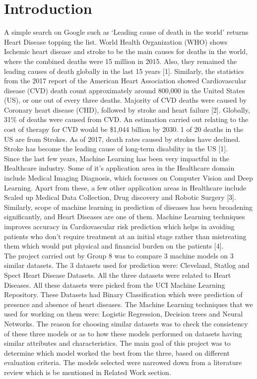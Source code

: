 \documentclass[conference]{IEEEtran}
\begin{document}
\section{Introduction}
A simple search on Google such as ‘Leading cause of death in the world’ returns Heart Disease topping the list. World Health Organization (WHO) shows Ischemic heart disease and stroke to be the main causes for deaths in the world, where the combined deaths were 15 million in 2015. Also, they remained the leading causes of death globally in the last 15 years [1]. Similarly, the statistics from the 2017 report of the American Heart Association showed Cardiovascular disease (CVD) death count approximately around 800,000 in the United States (US), or one out of every three deaths. Majority of CVD deaths were caused by Coronary heart disease (CHD), followed by stroke and heart failure [2]. Globally, 31\% of deaths were caused from CVD. An estimation carried out relating to the cost of therapy for CVD would be \$1,044 billion by 2030. 1 of 20 deaths in the US are from Strokes. As of 2017, death rates caused by strokes have declined. Stroke has become the leading cause of long-term disability in the US [1].\\

Since the last few years, Machine Learning has been very impactful in the Healthcare industry. Some of it’s application area in the Healthcare domain include Medical Imaging Diagnosis, which focusses on Computer Vision and Deep Learning. Apart from these, a few other application areas in Healthcare include Scaled up Medical Data Collection, Drug discovery and Robotic Surgery [3]. Similarly, scope of machine learning in prediction of diseases has been broadening significantly, and Heart Diseases are one of them. Machine Learning techniques improves accuracy in Cardiovascular risk prediction which helps in avoiding patients who don’t require treatment at an initial stage rather than mistreating them which would put  physical and financial burden on the patients [4].\\

The project carried out by Group 8 was to compare 3 machine models on 3 similar datasets. The 3 datasets used for prediction were: Cleveland, Statlog and Spect Heart Disease Datasets. All the three datasets were related to Heart Diseases. All these datasets were picked from the UCI Machine Learning Repository. These Datasets had Binary Classification which were prediction of presence and absence of heart diseases. The Machine Learning techniques that we used for working on them were: Logistic Regression, Decision trees and Neural Networks. The reason for choosing similar datasets was to check the consistency of these three models or as to how these models performed on datasets having similar attributes and characteristics. The main goal of this project was to determine which model worked the best from the three, based on different evaluation criteria. The models selected were narrowed down from a literature review which is be mentioned in Related Work section.
\end{document}
